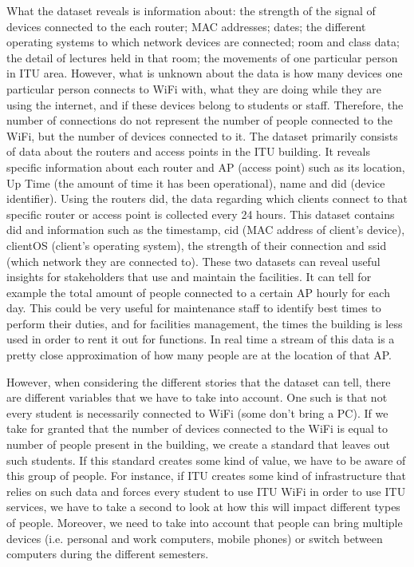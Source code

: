 \documentclass[format=acmsmall, review=false, screen=true]{acmart}
\begin{document}
What the dataset reveals is information about: the strength of the signal of devices connected to the each router; MAC addresses; dates; the different operating systems to which network devices are connected; room and class data; the detail of lectures held in that room; the movements of one particular person in ITU area. However, what is unknown about the data is how many devices one particular person connects to WiFi with, what they are doing while they are using the internet, and if these devices belong to students or staff. Therefore, the number of connections do not represent the number of people connected to the WiFi, but the number of devices connected to it.
The dataset primarily consists of data about the routers and access points in the ITU building. It reveals specific information about each router and AP (access point) such as its location, Up Time (the amount of time it has been operational), name and did (device identifier). Using the routers did, the data regarding which clients connect to that specific router or access point is collected every 24 hours. This dataset contains did and information such as the timestamp, cid (MAC address of client’s device), clientOS (client’s operating system), the strength of their connection and ssid (which network they are connected to). These two datasets can reveal useful insights for stakeholders that use and maintain the facilities. It can tell for example the total amount of people connected to a certain AP hourly for each day. This could be very useful for maintenance staff to identify best times to perform their duties, and for facilities management, the times the building is less used in order to rent it out for functions. In real time a stream of this data is a pretty close approximation of how many people are at the location of that AP.

However, when considering the different stories that the dataset can tell, there are different variables that we have to take into account. One such is that not every student is necessarily connected to WiFi (some don’t bring a PC). If we take for granted that the number of devices connected to the WiFi is equal to number of people present in the building, we create a standard that leaves out such students. If this standard creates some kind of value, we have to be aware of this group of people. For instance, if ITU creates some kind of infrastructure that relies on such data and forces every student to use ITU WiFi in order to use ITU services, we have to take a second to look at how this will impact different types of people. 
Moreover, we need to take into account that people can bring multiple devices (i.e. personal and work computers, mobile phones) or switch between computers during the different semesters.
\end{document}
